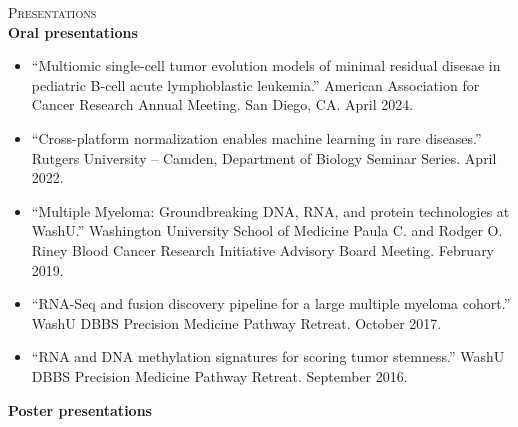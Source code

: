 \documentclass[11pt]{article}
\begin{document}
\bigskip

\textsc{\Large Presentations} \\

\textbf{Oral presentations}

\begin{itemize}
  \item ``Multiomic single-cell tumor evolution models of minimal residual disesae in pediatric B-cell acute lymphoblastic leukemia.'' American Association for Cancer Research Annual Meeting. San Diego, CA. April 2024.
  \item ``Cross-platform normalization enables machine learning in rare diseases.'' Rutgers University – Camden, Department of Biology Seminar Series. April 2022.
	\item ``Multiple Myeloma: Groundbreaking DNA, RNA, and protein technologies at WashU.'' Washington University School of Medicine Paula C. and Rodger O. Riney Blood Cancer Research Initiative Advisory Board Meeting. February 2019.
	\item ``RNA-Seq and fusion discovery pipeline for a large multiple myeloma cohort.'' WashU DBBS Precision Medicine Pathway Retreat. October 2017.
	\item ``RNA and DNA methylation signatures for scoring tumor stemness.'' WashU DBBS Precision Medicine Pathway Retreat. September 2016.
\end{itemize}

\textbf{Poster presentations}
\end{document}
